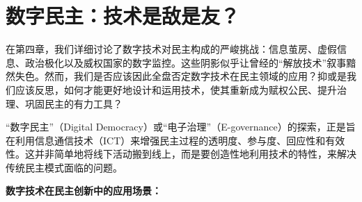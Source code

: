 \documentclass[UTF8, 10pt]{ctexbook}
\begin{document}
\section{数字民主：技术是敌是友？}
\lettrine[lines=2]{在}{第四章}，我们详细讨论了数字技术对民主构成的严峻挑战：信息茧房、虚假信息、政治极化以及威权国家的数字监控。这些阴影似乎让曾经的“解放技术”叙事黯然失色。然而，我们是否应该因此全盘否定数字技术在民主领域的应用？抑或是我们应该反思，如何才能更好地设计和运用技术，使其重新成为赋权公民、提升治理、巩固民主的有力工具？

“数字民主”（Digital Democracy）或“电子治理”（E-governance）的探索，正是旨在利用信息通信技术（ICT）来增强民主过程的透明度、参与度、回应性和有效性。这并非简单地将线下活动搬到线上，而是要创造性地利用技术的特性，来解决传统民主模式面临的问题。

\textbf{数字技术在民主创新中的应用场景：}
\end{document}
